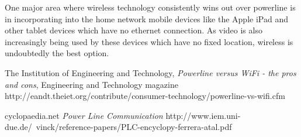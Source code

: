 \documentclass[11pt]{article}
\begin{document}
\begin{multicols}{2}
One major area where wireless technology consistently wins out over powerline is in incorporating into the home network mobile devices like the Apple iPad and other tablet devices which have no ethernet connection. As video is also increasingly being used by these devices which have no fixed location, wireless is undoubtedly the best option.

\begin{thebibliography}{9}

The Institution of Engineering and Technology,
\emph{Powerline versus WiFi - the pros and cons},
Engineering and Technology magazine
http://eandt.theiet.org/contribute/consumer-technology/powerline-vs-wifi.cfm

cyclopaedia.net
\emph{Power Line Communication}
http://www.iem.uni-due.de/~vinck/reference-papers/PLC-encyclopy-ferrera-atal.pdf

\end{thebibliography}


\end{multicols}
\end{document}
